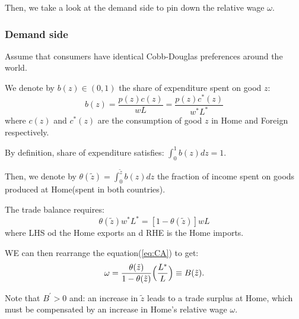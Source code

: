 Then, we take a look at the demand side to pin down the relative wage $\omega$.
\subsubsection{Demand side}

Assume that consumers have identical Cobb-Douglas preferences around the world.

We denote by $b(z) \in (0,1)$ the share of expenditure spent on good $z$:
\[b(z) = \frac{p(z) c(z)}{wL} = \frac{p(z)c^*(z)}{w^* L^*}\]
where $c(z)$ and $c^*(z)$ are the consumption of good $z$ in Home and Foreign respectively.

By definition, share of expenditure satisfies: $\int_{0}^{1} b(z) dz = 1$.

Then, we denote by $\theta(\tilde{z}) = \int_0^{\tilde{z}} b(z) dz$ the fraction of income spent
on goods produced at Home(spent in both countries).

The trade balance requires: 
\[\theta(\tilde{z}) w^* L^* = [1-\theta (\tilde{z})]wL\]
where LHS od the Home exports an d RHE is the Home imports.

WE can then rearrange the equation(\ref{eq:CA}) to get:
\begin{equation}
    \omega  = \frac{\theta(\tilde{z})}{1 - \theta(\tilde{z})}\Bigl(\frac{L^*}{L}\Bigr) \equiv B(\tilde{z}).
\end{equation}

Note that $B^{\prime} > 0$ and: an increase in $\tilde{z}$ leads to a trade surplus at Home,
which must be compensated by an increase in Home's relative wage $\omega$.


